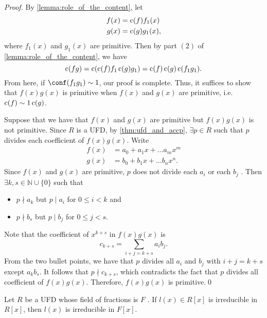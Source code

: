 \begin{proof}
  By \cref{lemma:role_of_the_content}, let
  \begin{align*}
    f(x) &= \operatorname{c}(f) f_1(x) \\
    g(x) &= \operatorname{c}(g) g_1(x),
  \end{align*}
  where $f_1(x)$ and $g_1(x)$ are primitive. Then by part $(2)$ of \cref{lemma:role_of_the_content}, we have
  \begin{equation*}
    \operatorname{c}(fg) = \operatorname{c}( \operatorname{c}(f) f_1 \operatorname{c}(g) g_1 ) = \operatorname{c}(f) \operatorname{c}(g) \operatorname{c}( f_1 g_1 ).
  \end{equation*}
  From here, if $\conf( f_1 g_1 ) \sim 1$, our proof is complete. Thus, it suffices to show that $f(x) g(x)$ is primitive when $f(x)$ and $g(x)$ are primitive, i.e. $\operatorname{c}(f) \sim 1 \operatorname{c}(g)$.
  
  Suppose that we have that $f(x)$ and $g(x)$ are primitive but $f(x) g(x)$ is not primitive. Since $R$ is a UFD, by \cref{thm:ufd_and_accp}, $\exists p \in R$ such that $p$ divides each coefficient of $f(x) g(x)$. Write
  \begin{align*}
    f(x) &= a_0 + a_1 x + \hdots a_m x^m \\
    g(x) &= b_0 + b_1 x + \hdots b_n x^n.
  \end{align*}
  Since $f(x)$ and $g(x)$ are primitive, $p$ does not divide each $a_i$ or each $b_j$ . Then $\exists k, s \in \mathbb{N} \cup \{0\}$ such that
  \begin{itemize}
    \item $p \nmid a_k$ but $p \mid a_i$ for $0 \leq i < k$ and
    \item $p \nmid b_s$ but $p \mid b_j$ for $0 \leq j < s$.
  \end{itemize}
  Note that the coefficient of $x^{k + s}$ in $f(x) g(x)$ is
  \begin{equation*}
    c_{k + s} = \sum_{i + j = k + s} a_i b_j.
  \end{equation*}
  From the two bullet points, we have that $p$ divides all $a_i$ and $b_j$ with $i + j = k + s$ except $a_k b_s$. It follows that $p \nmid c_{k + s}$, which contradicts the fact that $p$ divides all coefficient of $f(x) g(x)$. Therefore, $f(x) g(x)$ is primitive.\qed
\end{proof}

\begin{thm}
\label{thm:reducibility_in_the_field_of_fractions}
Let $R$ be a UFD whose field of fractions is $F$ . If $l(x) \in R[x]$ is irreducible in $R[x]$, then $l(x)$ is irreducible in $F[x]$.
\end{thm}

